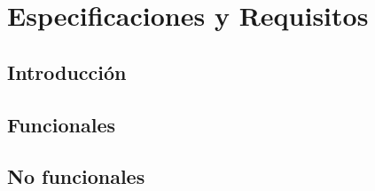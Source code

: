\section{Especificaciones y Requisitos}

\subsection{Introducción}
 

\subsection{Funcionales}


\subsection{No funcionales}

\newpage
